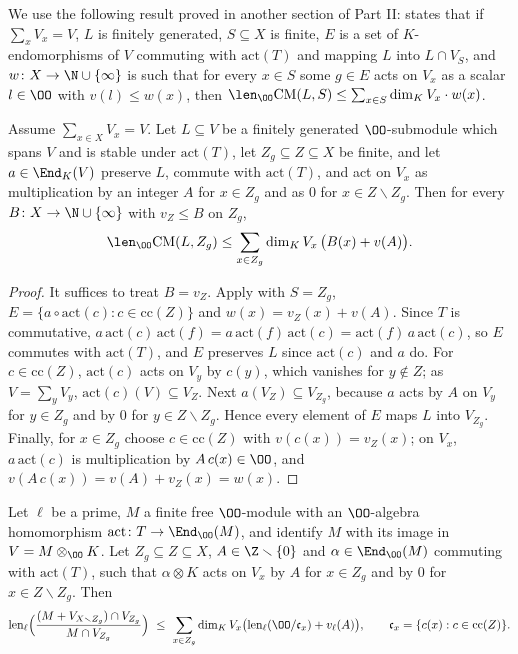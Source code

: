 We use the following result proved in another section of Part II:
 states that if $\sum_xV_x=V$, $L$ is finitely generated, $S\subseteq X$ is
finite, $E$ is a set of $K$-endomorphisms of $V$ commuting with $\mathrm{act}(T)$ and mapping $L$ into $L\cap V_S$, and
$w\colon X\to\N\cup\{\infty\}$ is such that for every $x\in S$ some $g\in E$ acts on $V_x$ as a scalar $l\in\OO$ with $v(l)\le w(x)$, then
$\len_\OO\mathrm{CM}(L,S)\le\sum_{x\in S}\dim_KV_x\cdot w(x)$.

\begin{lemma}\label{pf:linkN-sel:etabound}
Assume $\sum_{x\in X}V_x=V$. Let $L\subseteq V$ be a finitely generated $\OO$-submodule which spans $V$ and is stable under
$\mathrm{act}(T)$, let $Z_g\subseteq Z\subseteq X$ be finite, and let $a\in\End_K(V)$ preserve $L$, commute with $\mathrm{act}(T)$, and act
on $V_x$ as multiplication by an integer $A$ for $x\in Z_g$ and as $0$ for $x\in Z\smallsetminus Z_g$. Then for every
$B\colon X\to\N\cup\{\infty\}$ with $v_Z\le B$ on $Z_g$,
\[
\len_\OO\mathrm{CM}(L,Z_g)\le\sum_{x\in Z_g}\dim_KV_x\,\bigl(B(x)+v(A)\bigr).
\]
\end{lemma}

\begin{proof}
It suffices to treat $B=v_Z$. Apply  with $S=Z_g$,
$E=\{a\circ\mathrm{act}(c):c\in\mathrm{cc}(Z)\}$ and $w(x)=v_Z(x)+v(A)$. Since $T$ is commutative, $a\,\mathrm{act}(c)\,\mathrm{act}(f)=
a\,\mathrm{act}(f)\,\mathrm{act}(c)=\mathrm{act}(f)\,a\,\mathrm{act}(c)$, so $E$ commutes with $\mathrm{act}(T)$, and $E$ preserves $L$ since
$\mathrm{act}(c)$ and $a$ do. For $c\in\mathrm{cc}(Z)$, $\mathrm{act}(c)$ acts on $V_y$ by $c(y)$, which vanishes for $y\notin Z$; as
$V=\sum_yV_y$, $\mathrm{act}(c)(V)\subseteq V_Z$. Next $a(V_Z)\subseteq V_{Z_g}$, because $a$ acts by $A$ on $V_y$ for $y\in Z_g$ and by
$0$ for $y\in Z\smallsetminus Z_g$. Hence every element of $E$ maps $L$ into $V_{Z_g}$. Finally, for $x\in Z_g$ choose $c\in\mathrm{cc}(Z)$
with $v(c(x))=v_Z(x)$; on $V_x$, $a\,\mathrm{act}(c)$ is multiplication by $A\,c(x)\in\OO$, and $v(A\,c(x))=v(A)+v_Z(x)=w(x)$.
\end{proof}

\begin{lemma}\label{pf:linkN-sel:heckelen}
Let $\ell$ be a prime, $M$ a finite free $\OO$-module with an $\OO$-algebra homomorphism $\mathrm{act}\colon T\to\End_\OO(M)$, and identify
$M$ with its image in $V=M\otimes_\OO K$. Let $Z_g\subseteq Z\subseteq X$, $A\in\Z\smallsetminus\{0\}$ and $\alpha\in\End_\OO(M)$ commuting
with $\mathrm{act}(T)$, such that $\alpha\otimes K$ acts on $V_x$ by $A$ for $x\in Z_g$ and by $0$ for $x\in Z\smallsetminus Z_g$. Then
\[
\linkNsellen\Bigl(\frac{(M+V_{X\smallsetminus Z_g})\cap V_{Z_g}}{M\cap V_{Z_g}}\Bigr)\ \le\ \sum_{x\in Z_g}\dim_KV_x
\bigl(\linkNsellen(\OO/\mathfrak c_x)+v_\ell(A)\bigr),\qquad \mathfrak c_x=\{c(x):c\in\mathrm{cc}(Z)\}.
\]
\end{lemma}

